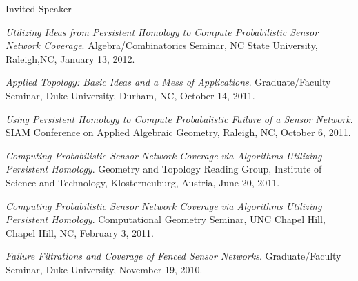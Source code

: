 \documentclass{resume} %
\begin{document}
\begin{rSection}{Invited Speaker}
\begin{etaremune}
\item\emph{Utilizing Ideas from Persistent Homology to Compute Probabilistic Sensor Network Coverage}. Algebra/Combinatorics Seminar, NC State University, Raleigh,NC, January 13, 2012. 

\item\emph{Applied Topology: Basic Ideas and a Mess of Applications}. Graduate/Faculty Seminar, Duke University, Durham, NC, October 14, 2011. 

\item\emph{Using Persistent Homology to Compute Probabalistic Failure of a Sensor Network}. SIAM Conference on Applied Algebraic Geometry, Raleigh, NC, October 6, 2011. 

\item\emph{Computing Probabilistic Sensor Network Coverage via Algorithms Utilizing Persistent Homology}. Geometry and Topology Reading Group, Institute of Science and Technology, Klosterneuburg, Austria, June 20, 2011. 

\item\emph{Computing Probabilistic Sensor Network Coverage via Algorithms Utilizing Persistent Homology}. Computational Geometry Seminar, UNC Chapel Hill, Chapel Hill, NC, February 3, 2011. 

\item\emph{Failure Filtrations and Coverage of Fenced Sensor Networks}. Graduate/Faculty Seminar, Duke University, November 19, 2010. 

\end{etaremune}
\end{rSection}


%
\end{document}
